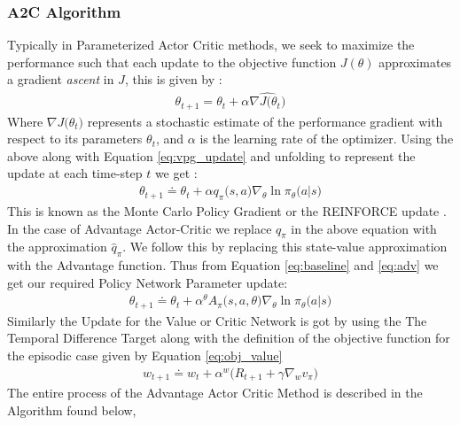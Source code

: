 \documentclass[14pt]{extarticle}
\numberwithin{equation}{section}
\begin{document}
	\subsubsection{A2C Algorithm}
	Typically in Parameterized Actor Critic methods, we seek to maximize the performance such that each update to the objective function $J(\theta)$ approximates a gradient \textit{ascent} in $J$, this is given by :
	\begin{align}
	\theta_{t+1} =  	\theta_t + \alpha \widehat{\nabla J\big(\theta_t\big)}
	\end{align} 
	Where $\nabla J\big(\theta_t\big)$ represents a stochastic estimate of the performance gradient with respect to its parameters $\theta_t$, and $\alpha$ is the learning rate of the optimizer.
	Using the above along with Equation \ref{eq:vpg_update} and unfolding to represent the update at each time-step $t$ we get :
	\begin{align}
	\theta_{t+1} \doteq \theta_t +  \alpha q_{\pi}\big(s,a\big) \nabla_{\theta}\ln\pi_{\theta}\big(a|s\big)
	\end{align}
	This is known as the Monte Carlo Policy Gradient or the REINFORCE update \cite{Williams92REINFORCE}. In the case of Advantage Actor-Critic we replace $q_{\pi}$ in the above equation with the approximation $\hat{q}_{\pi}$. We follow this by replacing this state-value approximation with the Advantage function. Thus from Equation \ref{eq:baseline} and \ref{eq:adv} we get our required Policy Network Parameter update:
	\begin{align}
	\theta_{t+1} \doteq \theta_t +  \alpha^{\theta} A_{\pi}\big(s,a,\theta\big) \nabla_{\theta}\ln\pi_{\theta}\big(a|s\big)
	\end{align}
	Similarly the Update for the Value or Critic Network is got by using the The Temporal Difference Target along with the definition of the objective function for the episodic case given by Equation \ref{eq:obj_value}\cite{Sutton-introRL}
	\begin{align}
	w_{t+1} \doteq w_t +  \alpha^{w}\big(R_{t+1} + \gamma\nabla_{w}v_{\pi}\big)  
	\end{align}
	The entire process of the Advantage Actor Critic Method is described in the Algorithm found below,
\end{document}
